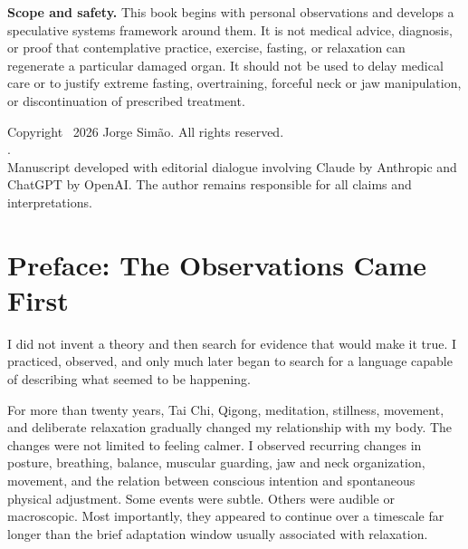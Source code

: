 \thispagestyle{empty}
\vspace*{\fill}
{\centering
{\sffamily\bfseries\Large \booktitle\par}
\vspace{.35em}
{\sffamily\large \booksubtitle\par}
\vspace{.2em}
{\sffamily\small \bookdescriptor\par}
\vspace{1.5em}
{\sffamily \bookauthor\par}
}
\vspace*{\fill}
\clearpage

\thispagestyle{empty}
\begin{scopebox}
\textbf{Scope and safety.} This book begins with personal observations and develops a speculative systems framework around them. It is not medical advice, diagnosis, or proof that contemplative practice, exercise, fasting, or relaxation can regenerate a particular damaged organ. It should not be used to delay medical care or to justify extreme fasting, overtraining, forceful neck or jaw manipulation, or discontinuation of prescribed treatment.
\end{scopebox}

\vfill
{\small
Copyright \textcopyright\ 2026 Jorge Simão. All rights reserved.\\
\bookversion.\\
Manuscript developed with editorial dialogue involving Claude by Anthropic and ChatGPT by OpenAI. The author remains responsible for all claims and interpretations.
}
\clearpage

\chapter*{Preface: The Observations Came First}
I did not invent a theory and then search for evidence that would make it true. I practiced, observed, and only much later began to search for a language capable of describing what seemed to be happening.

For more than twenty years, Tai Chi, Qigong, meditation, stillness, movement, and deliberate relaxation gradually changed my relationship with my body. The changes were not limited to feeling calmer. I observed recurring changes in posture, breathing, balance, muscular guarding, jaw and neck organization, movement, and the relation between conscious intention and spontaneous physical adjustment. Some events were subtle. Others were audible or macroscopic. Most importantly, they appeared to continue over a timescale far longer than the brief adaptation window usually associated with relaxation.

